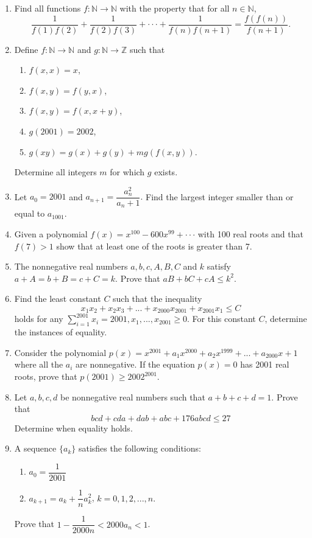 \documentclass[12pt]{article}
\begin{document}
\begin{enumerate}
    \item Find all functions $f:\mathbb{N}\rightarrow\mathbb{N}$ with the property that for all $n\in\mathbb{N}$,
    $$\dfrac{1}{f(1)f(2)}+\dfrac{1}{f(2)f(3)}+\cdot\cdot\cdot+\dfrac{1}{f(n)f(n+1)}=\dfrac{f(f(n))}{f(n+1)}.$$

    \item Define $f:\mathbb{N}\rightarrow\mathbb{N}$ and $g:\mathbb{N}\rightarrow\mathbb{Z}$ such that
    \begin{enumerate}
        \item[(a)] $f(x,x)=x$,
        \item[(b)] $f(x,y)=f(y,x)$,
        \item[(c)] $f(x,y)=f(x,x+y)$,
        \item[(d)] $g(2001)=2002$,
        \item[(e)] $g(xy)=g(x)+g(y)+mg(f(x,y))$.
    \end{enumerate}
    Determine all integers $m$ for which $g$ exists.

    \item Let $a_{0}=2001$ and $a_{n+1}=\dfrac{a_{n}^{2}}{a_{n}+1}.$ Find the largest integer smaller than or equal to $a_{1001}$.

    \item Given a polynomial $f(x)=x^{100}-600x^{99}+\cdot\cdot\cdot$ with 100 real roots and that $f(7)>1$ show that at least one of the roots is greater than 7.

    \item The nonnegative real numbers $a, b, c, A, B, C$ and $k$ satisfy $a+A=b+B=c+C=k$. Prove that $aB+bC+cA\le k^{2}$.

    \item Find the least constant $C$ such that the inequality 
    $$x_{1}x_{2}+x_{2}x_{3}+...+x_{2000}x_{2001}+x_{2001}x_{1}\le C$$ 
    holds for any $\sum_{i=1}^{2001}x_{i}=2001, x_{1},...,x_{2001}\ge0$. For this constant $C$, determine the instances of equality.

    \item Consider the polynomial $p(x)=x^{2001}+a_{1}x^{2000}+a_{2}x^{1999}+...+a_{2000}x+1$ where all the $a_{i}$ are nonnegative. If the equation $p(x)=0$ has 2001 real roots, prove that $p(2001)\ge2002^{2001}$.

    \item Let $a, b, c, d$ be nonnegative real numbers such that $a+b+c+d=1.$ Prove that 
    $$bcd + cda + dab+abc+ 176 abcd \le 27$$ 
    Determine when equality holds.

    \item A sequence $\{a_{k}\}$ satisfies the following conditions:
    \begin{enumerate}
        \item[(a)] $a_{0}=\dfrac{1}{2001}$
        \item[(b)] $a_{k+1}=a_{k}+\dfrac{1}{n}a_{k}^{2}$, $k=0,1,2,...,n.$
    \end{enumerate}
    Prove that $1-\dfrac{1}{2000n}<2000a_{n}<1$.
\end{enumerate}
\end{document}
